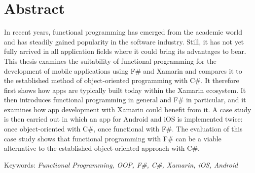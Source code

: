 \section*{Abstract}

In recent years, functional programming has emerged from the academic world and has steadily gained popularity in the software industry. Still, it has not yet fully arrived in all application fields where it could bring its advantages to bear. This thesis examines the suitability of functional programming for the development of mobile applications using F\# and Xamarin and compares it to the established method of object-oriented programming with C\#. It therefore first shows how apps are typically built today within the Xamarin ecosystem. It then introduces functional programming in general and F\# in particular, and it examines how app development with Xamarin could benefit from it. A case study is then carried out in which an app for Android and iOS is implemented twice: once object-oriented with C\#, once functional with F\#. The evaluation of this case study shows that functional programming with F\# can be a viable alternative to the established object-oriented approach with C\#.

Keywords: \textit{Functional Programming, OOP, F\#, C\#, Xamarin, iOS, Android}
